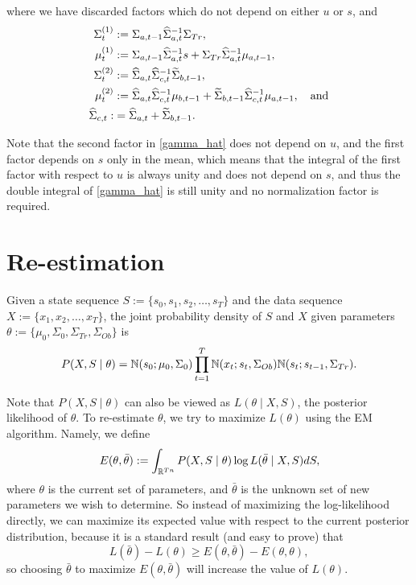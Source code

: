 \documentclass[12pt,leqno]{article}
\begin{document}
  where we have discarded factors which do not depend on either $u$ or $s$, and 
  \begin{align}
    \Sigma^{(1)}_t &:= \Sigma_{a,t-1}\widehat{\Sigma}_{a,t}^{-1}\Sigma_{Tr},\notag\\
    \mu^{(1)}_t &:= \Sigma_{a,t-1}\widehat{\Sigma}_{a,t}^{-1}s + \Sigma_{Tr}\widehat{\Sigma}_{a,t}^{-1}\mu_{a,t-1},\label{mu(1)}\\
    \Sigma^{(2)}_t &:= \widehat{\Sigma}_{a,t}\widehat{\Sigma}_{c,t}^{-1}\widetilde{\Sigma}_{b,t-1},\notag\\
    \mu^{(2)}_t &:= \widehat{\Sigma}_{a,t}\widehat{\Sigma}_{c,t}^{-1}\mu_{b,t-1} +
    \widetilde{\Sigma}_{b,t-1}\widehat{\Sigma}_{c,t}^{-1}\mu_{a,t-1},\notag\quad\text{and}\\
    \widehat{\Sigma}_{c,t} :&= \widehat{\Sigma}_{a,t} + \widetilde{\Sigma}_{b,t-1}.\notag
  \end{align}

  Note that the second factor in \eqref{gamma_hat} does not depend on $u$, and the first factor depends on $s$
  only in the mean, which means that the integral of the first factor with respect to $u$ is always unity
  and does not depend on $s$, and thus the double integral of \eqref{gamma_hat} is still unity and no
  normalization factor is required.
  
\section{Re-estimation}
Given a state sequence $S := \{s_0,s_1,s_2,\dots,s_T\}$ and the data sequence $X := \{x_1,x_2,\dots,x_T\}$, the
joint probability density of $S$ and $X$ given parameters $\theta := \{\mu_0,\Sigma_0,\Sigma_{Tr},\Sigma_{Ob}\}$ is
$$
P(X,S\mid\theta) = {\mathbb N}(s_0;\mu_0,\Sigma_0)\prod_{t=1}^T{\mathbb N}(x_t;s_t,\Sigma_{Ob}){\mathbb N}(s_t;s_{t-1},\Sigma_{Tr}).
$$

Note that $P(X,S\mid\theta)$ can also be viewed as  $L(\theta\mid X,S)$, the posterior likelihood of $\theta$.
To re-estimate $\theta$, we try to maximize $L(\theta)$ using the EM algorithm. Namely, we define 
$$
E(\theta,\bar{\theta}) := \int_{{\mathbb R}^{Tn}}P(X,S\mid\theta)\log{L(\bar{\theta}\mid X,S)}dS,
$$
where $\theta$ is the current set of parameters, and $\bar{\theta}$ is the unknown set of new parameters
we wish to determine. So instead of maximizing the log-likelihood directly, we can maximize its expected
value with respect to the current posterior distribution, because it is a standard result (and easy to prove) that
$$
L(\bar{\theta}) - L(\theta) \ge E(\theta,\bar{\theta}) - E(\theta,\theta),
$$
so choosing $\bar{\theta}$ to maximize $E(\theta,\bar{\theta})$ will increase the value of $L(\theta)$.
\end{document}
